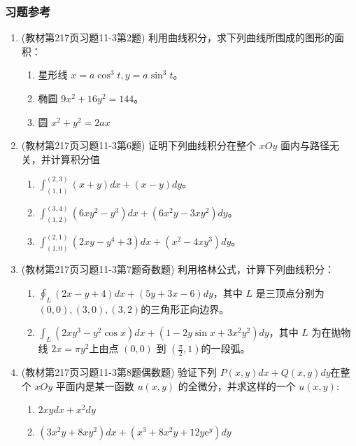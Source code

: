 \subsubsection{习题参考}
\begin{enumerate}
\item (教材第217页习题11-3第2题) 利用曲线积分，求下列曲线所围成的图形的面积：
    \begin{enumerate}[(1)]
        \item 星形线 $x = a \cos^3 t, y=a \sin^3 t $。
        \item 椭圆 $9x^2 + 16y^2 =144$。
        \item 圆 $x^2 + y^2 =2ax$
    \end{enumerate}

\item (教材第217页习题11-3第6题) 证明下列曲线积分在整个 $xOy$ 面内与路径无关，并计算积分值
    \begin{enumerate}[(1)]
        \item $\int _{(1,1)}^{(2,3)} (x+y) dx + (x-y)dy$。
        \item $\int _{(1,2)}^{(3,4)} (6xy^2 - y^3) dx + (6x^2y -3xy^2) dy$。
        \item $\int _{(1,0)}^{(2,1)} (2xy - y^4 +3)dx + (x^2 - 4xy^3)dy $。
    \end{enumerate}

\item (教材第217页习题11-3第7题奇数题) 利用格林公式，计算下列曲线积分：
    \begin{enumerate}[(1)]
        \item $\oint _L (2x-y+4) dx + (5y + 3x -6) dy$，其中 $L$ 是三顶点分别为 $(0,0),(3,0),(3,2)$的三角形正向边界。
        \item $\int _L (2xy^3 - y^2 \cos x)dx + (1-2y\sin x + 3x^2y^2)dy$，其中 $L$ 为在抛物线 $2x = \pi y^2$上由点 $(0,0)$ 到 $(\frac{\pi}{2}, 1)$的一段弧。
    \end{enumerate}

\item (教材第217页习题11-3第8题偶数题) 验证下列 $P(x,y)dx + Q(x,y)dy$在整个 $xOy$ 平面内是某一函数 $u(x,y)$ 的全微分，并求这样的一个 $u(x,y)$:
    \begin{enumerate}[(1)]
        \item $2xydx + x^2 dy$
        \item $(3x^2y + 8xy^2)dx + (x^3 + 8x^2y + 12y \mathrm{e}^{y})dy$
    \end{enumerate}

\end{enumerate}

